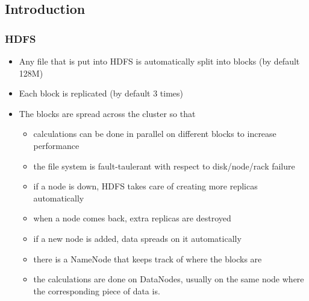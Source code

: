 \documentclass{beamer}
\begin{document}
\subsection{Introduction}
\begin{frame}
 \frametitle{HDFS}
    \begin{itemize}
     \item Any file that is put into HDFS is automatically split into blocks (by default 128M)
     \item Each block is replicated (by default 3 times)
     \item The blocks are spread across the cluster so that
      \begin{itemize}
	\item calculations can be done in parallel on different blocks to increase performance
	\item the file system is fault-taulerant with respect to disk/node/rack failure
	\item if a node is down, HDFS takes care of creating more replicas automatically
	\item when a node comes back, extra replicas are destroyed
	\item if a new node is added, data spreads on it automatically
	\item there is a {\color{mycolordef}NameNode} that keeps track of where the blocks are
	\item the calculations are done on {\color{mycolordef}DataNodes}, usually on the same node where the corresponding piece of data is.
      \end{itemize}
    \end{itemize} 
\end{frame}
\end{document}
